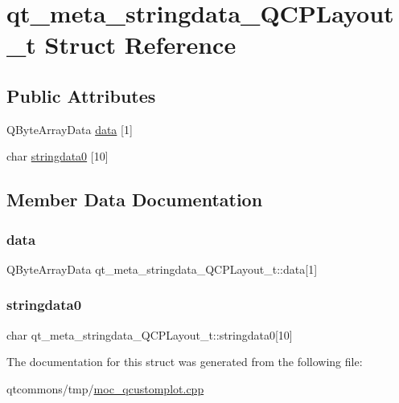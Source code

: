 \hypertarget{structqt__meta__stringdata___q_c_p_layout__t}{}\section{qt\+\_\+meta\+\_\+stringdata\+\_\+\+Q\+C\+P\+Layout\+\_\+t Struct Reference}
\label{structqt__meta__stringdata___q_c_p_layout__t}
\subsection*{Public Attributes}
\begin{DoxyCompactItemize}
\item 
Q\+Byte\+Array\+Data \mbox{\hyperlink{structqt__meta__stringdata___q_c_p_layout__t_a133fdcad1faf8247b373a50c8dcb604f}{data}} \mbox{[}1\mbox{]}
\item 
char \mbox{\hyperlink{structqt__meta__stringdata___q_c_p_layout__t_ad487cc776f3a79ee6a9f10c234b3ade0}{stringdata0}} \mbox{[}10\mbox{]}
\end{DoxyCompactItemize}


\subsection{Member Data Documentation}
\mbox{\label{structqt__meta__stringdata___q_c_p_layout__t_a133fdcad1faf8247b373a50c8dcb604f}} 
\subsubsection{\texorpdfstring{data}{data}}
{\footnotesize\ttfamily Q\+Byte\+Array\+Data qt\+\_\+meta\+\_\+stringdata\+\_\+\+Q\+C\+P\+Layout\+\_\+t\+::data\mbox{[}1\mbox{]}}

\mbox{\label{structqt__meta__stringdata___q_c_p_layout__t_ad487cc776f3a79ee6a9f10c234b3ade0}} 
\subsubsection{\texorpdfstring{stringdata0}{stringdata0}}
{\footnotesize\ttfamily char qt\+\_\+meta\+\_\+stringdata\+\_\+\+Q\+C\+P\+Layout\+\_\+t\+::stringdata0\mbox{[}10\mbox{]}}



The documentation for this struct was generated from the following file\+:\begin{DoxyCompactItemize}
\item 
qtcommons/tmp/\mbox{\hyperlink{moc__qcustomplot_8cpp}{moc\+\_\+qcustomplot.\+cpp}}\end{DoxyCompactItemize}
